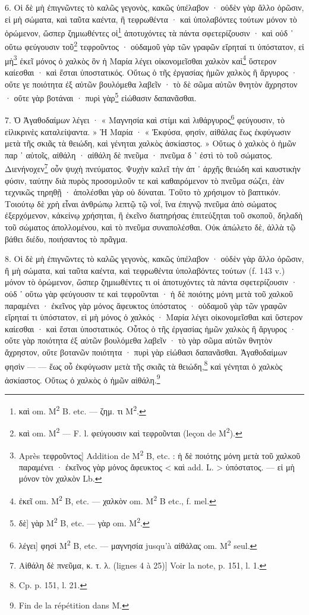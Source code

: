 \documentclass[a4paper, 11pt, oneside, polutonikogreek, french]{article}
\begin{document}
6. Οἱ δὲ μὴ ἐπιγνῶντες τὸ καλῶς γεγονὸς, κακῶς ὑπέλαβον · οὐδὲν γὰρ ἄλλο ὁρῶσιν, εἰ μὴ σώματα, καὶ ταῦτα καέντα, ἢ τεφρωθέντα · καὶ ὑπολαβόντες τούτων μόνον τὸ ὁρώμενον, ὥσπερ ζημιωθέντες οἱ\footnote{καὶ om. M\textsuperscript{2} B. etc. --- ζημ. τι M\textsuperscript{2}.} ἀποτυχόντες τὰ πάντα σφετερίζουσιν · καὶ οὐδ ᾽ οὕτω φεύγουσιν τοῦ\footnote{καὶ om. M\textsuperscript{2} --- F. l. φεύγουσιν καὶ τεφροῦνται (leçon de M\textsuperscript{2}).} τεφροῦντος · οὐδαμοῦ γὰρ τῶν γραφῶν εἴρηταί τι ὑπόστατον, εἰ μὴ\footnote{Après τεφροῦντος] Addition de M\textsuperscript{2} B, etc. : ἡ δὲ ποιότης μόνη μετὰ τοῦ χαλκοῦ παραμένει · ἐκεῖνος γὰρ μόνος ἄφευκτος < καὶ add. L. > ὑπόστατος. --- εἰ μὴ μόνον τὸν χαλκὸν Lb.} ἐκεῖ μόνος ὁ χαλκὸς ὃν ἡ Μαρία λέγει οἰκονομεῖσθαι χαλκὸν καὶ\footnote{ἐκεῖ om. M\textsuperscript{2} B, etc. --- χαλκὸν om. M\textsuperscript{2} B etc., f. mel.} ὕστερον καίεσθαι · καὶ ἔσται ὑποστατικός. Οὕτως ὁ τῆς ἐργασίας ἡμῶν χαλκὸς ἢ ἄργυρος · οὔτε γε ποιότητα ἐξ αὐτῶν βουλόμεθα λαβεῖν · τὸ δὲ σῶμα αὐτῶν θνητὸν ἄχρηστον · οὔτε γὰρ βοτάναι · πυρὶ γὰρ\footnote{δὲ] γὰρ M\textsuperscript{2} B, etc. ---  γὰρ om. M\textsuperscript{2}.} εἰώθασιν δαπανᾶσθαι.

7. Ὁ Ἀγαθοδαίμων λέγει · « Μαγνησία καὶ στίμι καὶ λιθάργυρος\footnote{λέγει] φησὶ M\textsuperscript{2} B, etc. --- μαγνησία jusqu'à αἰθάλας om. M\textsuperscript{2} seul.} φεύγουσιν, τὸ εἰλικρινὲς καταλείψαντα. » Ἡ Μαρία · « Ἐκφύσα, φησὶν, αἰθάλας ἕως ἐκφύγωσιν μετὰ τῆς σκιᾶς τὰ θειώδη, καὶ γένηται χαλκὸς ἀσκίαστος. » Οὕτως ὁ χαλκὸς ὁ ἡμῶν παρ ᾽ αὐτοῖς, αἰθάλη · αἰθάλη δὲ πνεῦμα · πνεῦμα δ ᾽ ἐστὶ τὸ τοῦ σώματος. Διενήνοχεν\footnote{Αἰθάλη δὲ πνεῦμα, κ. τ. λ. (lignes 4 à 25)] Voir la note, p. 151, l. 1.} οὖν ψυχὴ πνεύματος. Ψυχὴν καλεῖ τὴν ἀπ ᾽ ἀρχῆς θειώδη καὶ καυστικὴν φύσιν, ταύτην διὰ πυρὸς προσομιλοῦν τε καὶ καθαιρόμενον τὸ πνεῦμα σώζει, ἐὰν τεχνικῶς τηρηθῇ · ἀπολέσθαι γὰρ οὐ δύναται. Τοῦτο τὸ χρήσιμον τὸ βαπτικόν. Τοιούτῳ δὲ χρὴ εἶναι ἀνθρώπῳ λεπτῷ τῷ νοΐ, ἵνα ἐπιγνῷ πνεῦμα ἀπὸ σώματος ἐξερχόμενον, κἀκείνῳ χρήσηται, ἢ ἐκεῖνο διατηρήσας ἐπιτεύξηται τοῦ σκοποῦ, δηλαδὴ τοῦ σώματος ἀπολλομένου, καὶ τὸ πνεῦμα συναπολέσθαι. Οὐκ ἀπώλετο δὲ, ἀλλὰ τῷ βάθει διέδυ, ποιήσαντος τὸ πρᾶγμα.

 

8. Οἱ δὲ μὴ ἐπιγνῶντες τὸ καλῶς γεγονὸς, κακῶς ὑπέλαβον · οὐδὲν γὰρ ἄλλο ὀρῶσιν, ἢ μὴ σώματα, καὶ ταῦτα καέντα, καὶ τεφρωθέντα ὑπολαβόντες τούτων (f. 143 v.) μόνον τὸ ὁρώμενον, ὥσπερ ζημιωθέντες τι οἱ ἀποτυχόντες τὰ πάντα σφετερίζουσιν · οὐδ ᾽ οὕτω γὰρ φεύγουσιν τε καὶ τεφροῦνται · ἡ δὲ ποιότης μόνη μετὰ τοῦ χαλκοῦ παραμένει · ἐκεῖνος γὰρ μόνος ἄφευκτος ὑπόστατος · οὐδαμοῦ γὰρ τῶν γραφῶν εἴρηταί τι ὑπόστατον, εἰ μὴ μόνος ὁ χαλκός · Μαρία λέγει οἰκονομεῖσθαι καὶ ὕστερον καίεσθαι · καὶ ἔσται ὑποστατικός. Οὗτος ὁ τῆς ἐργασίας ἡμῶν χαλκὸς ἢ ἄργυρος · οὔτε γὰρ ποιότητα ἐξ αὐτῶν βουλόμεθα λαβεῖν · τὸ γὰρ σῶμα αὐτῶν θνητὸν ἄχρηστον, οὔτε βοτανῶν ποιότητα · πυρὶ γὰρ εἰώθασι δαπανᾶσθαι. Ἀγαθοδαίμων φησὶν --- --- ἕως οὗ ἐκφύγωσιν μετὰ τῆς σκιᾶς τὰ θειώδη,\footnote{Cp. p. 151, l. 21.} καὶ γένηται ὁ χαλκὸς ἀσκίαστος. Οὕτως ὁ χαλκὸς ὁ ἡμῶν αἰθάλη.\footnote{Fin de la répétition dans M.}
\end{document}
